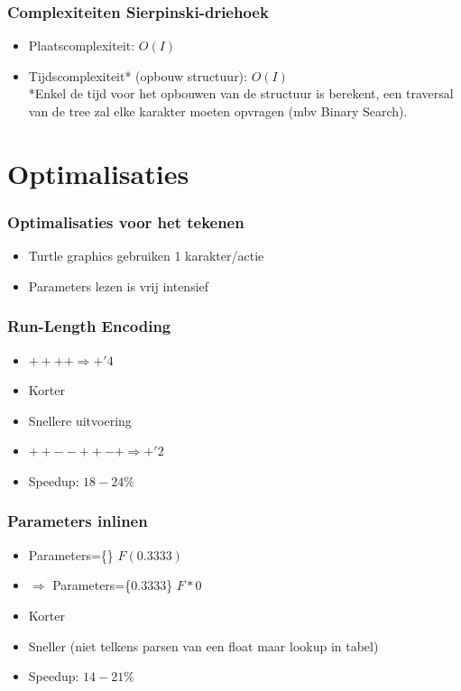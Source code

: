 \documentclass[ignorenonframetext,compress]{beamer}
\begin{document}
\begin{frame}[fragile]
	\frametitle{Complexiteiten Sierpinski-driehoek}
\begin{itemize}
\item Plaatscomplexiteit: $O(I)$
\item Tijdscomplexiteit* (opbouw structuur): $O(I)$
\pause
\\ *Enkel de tijd voor het opbouwen van de structuur is berekent, een traversal van de tree zal elke karakter moeten opvragen (mbv Binary Search).
\end{itemize}
\end{frame}

\section{Optimalisaties}
\begin{frame}[fragile]
	\frametitle{Optimalisaties voor het tekenen}
\begin{itemize}
\item Turtle graphics gebruiken 1 karakter/actie
\item Parameters lezen is vrij intensief
\end{itemize}
\end{frame}

\begin{frame}[fragile]
	\frametitle{Run-Length Encoding}
\begin{itemize}
\item $++++ \Rightarrow +'4$
\pause
\item Korter
\item Snellere uitvoering
\pause
\item $++--++-+ \Rightarrow +'2$
\pause
\item Speedup: $18-24\%$
\end{itemize}
\end{frame}

\begin{frame}[fragile]
	\frametitle{Parameters inlinen}
\begin{itemize}
\item Parameters=\{\} $F(0.3333)$
\item $\Rightarrow$ Parameters=\{0.3333\} $F*0$
\pause
\item Korter
\item Sneller (niet telkens parsen van een float maar lookup in tabel)
\pause
\item Speedup: $14-21\%$
\end{itemize}
\end{frame}
\end{document}
